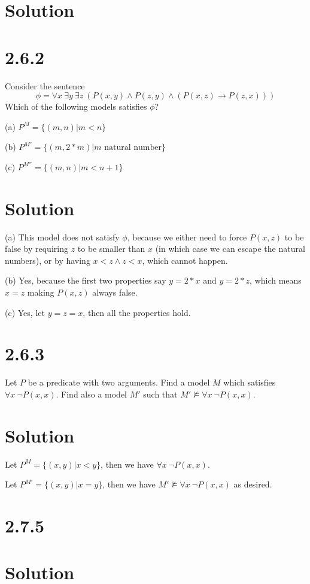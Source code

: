 \documentclass[10pt]{article}
\begin{document}
\section*{Solution}

\section*{2.6.2}
Consider the sentence
\[
\phi = \forall x\ \exists y\ \exists z\ (P(x,y)\land P(z,y) \land (P(x,z)\to P(z,x)))
\]
Which of the following models satisfies $\phi$?
\begin{description*}
\item[(a)] $P^M = \{ (m,n) | m < n \}$
\item[(b)] $P^{M'} = \{ (m,2*m) | m \text{ natural number} \}$ 
\item[(c)] $P^{M''} = \{ (m,n) | m < n + 1\}$
\end{description*}
\section*{Solution}
\begin{description*}
\item[(a)] This model does not satisfy $\phi$, because we either need to force $P(x,z)$ to be false by requiring $z$ to be smaller than $x$ (in which case we can escape the natural numbers), or by having $x<z \land z<x$, which cannot happen.
\item[(b)] Yes, because the first two properties say $y=2*x$ and $y=2*z$, which means $x=z$ making $P(x,z)$ always false.
\item[(c)] Yes, let $y=z=x$, then all the properties hold.
\end{description*}
\section*{2.6.3}
Let $P$ be a predicate with two arguments. Find a model $M$ which satisfies $\forall x\ \lnot P(x,x)$. Find also a model $M'$ such that $M'\not \models \forall x\ \lnot P(x,x)$.

\section*{Solution}

\begin{itemize*}
\item Let $P^{M} = \{ (x,y) | x < y\}$, then we have $\forall x\ \lnot P(x,x)$.
\item Let $P^{M'} = \{ (x,y) | x = y\}$, then we have $M'\not \models \forall x\ \lnot P(x,x)$ as desired.
\end{itemize*}

\section*{2.7.5}

\section*{Solution}
\end{document}
